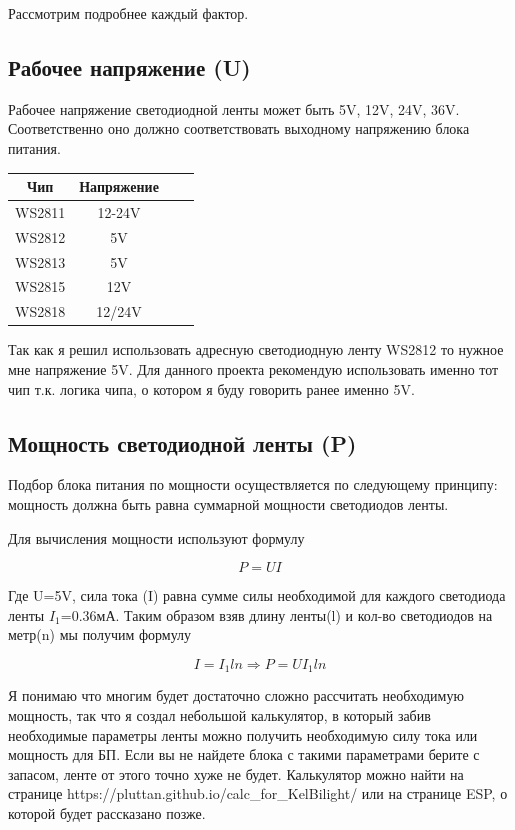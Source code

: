 \documentclass[a4paper, 12pt]{article}
\begin{document}
Рассмотрим подробнее каждый фактор.

\subsection{Рабочее напряжение (U)}

Рабочее напряжение светодиодной ленты может быть 5V, 12V, 24V, 36V. 
Соответственно оно должно соответствовать выходному напряжению блока питания. 

\begin{table}[H]
    \begin{center}
    \begin{tabular}{|c|c|c|c|}
        \hline
        Чип&	Напряжение	\\
        \hline
        WS2811&	12-24V\\
        WS2812&	5V\\
        WS2813&	5V\\
        WS2815&	12V\\
        WS2818&	12/24V\\
        \hline
    \end{tabular}
\end{center}
\end{table}
Так как я решил использовать адресную светодиодную ленту WS2812 то нужное мне
напряжение 5V. Для данного проекта рекомендую использовать именно тот чип 
т.к. логика чипа, о котором я буду говорить ранее именно 5V.

\subsection{Мощность светодиодной ленты (P)}

Подбор блока питания по мощности осуществляется по следующему принципу: 
мощность должна быть равна суммарной мощности светодиодов ленты.

Для вычисления мощности используют формулу 

$$P=UI$$

Где U=5V, сила тока (I) равна сумме силы необходимой для каждого светодиода 
ленты $I_1$=0.36мА. Таким образом взяв длину ленты(l) и кол-во светодиодов на 
метр(n) мы получим формулу

$$I=I_1ln \Rightarrow P=UI_1ln$$

Я понимаю что многим будет достаточно сложно рассчитать необходимую мощность, 
так что я создал небольшой калькулятор, в который забив необходимые параметры 
ленты можно получить необходимую силу тока или мощность для БП. Если вы не 
найдете блока с такими параметрами берите с запасом, ленте от этого точно хуже 
не будет. Калькулятор можно найти на странице 
https://pluttan.github.io/calc\_for\_KelBilight/ или на странице ESP, о которой
будет рассказано позже. 
\end{document}
